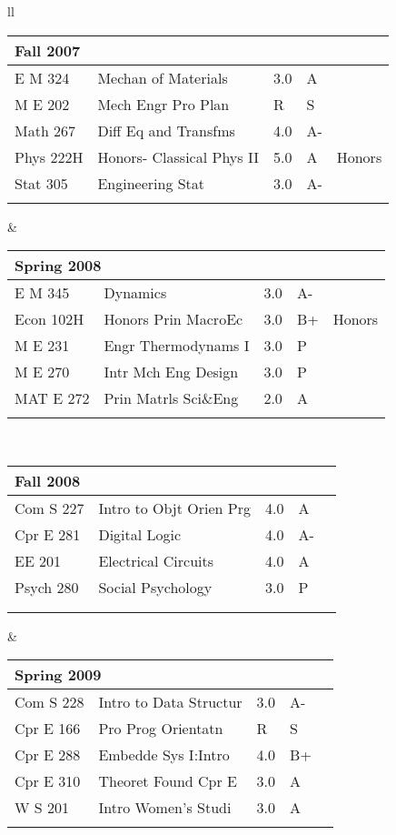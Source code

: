 \documentclass[oneside]{article}
\newcommand{\semtable}[1]{
  \begin{tabular}{p{1.5cm} p{3.5cm} p{.3cm} p{.3cm} p{0.75cm}}
    \multicolumn{5}{l}{#1}\\
    \hline
}
\newcommand{\semtableend}{
  \\
  \end{tabular}
}
\begin{document}
{\begin{tabular}{ll}
    \semtable{Fall 2007}
      E M 324 & Mechan of Materials & 3.0 & A &\\
      M E 202 & Mech Engr Pro Plan & R & S &\\
      Math 267 & Diff Eq and Transfms & 4.0 & A- &\\
      Phys 222H & Honors- Classical Phys II & 5.0 & A &Honors\\
      Stat 305 & Engineering Stat & 3.0 & A- & \\
    \semtableend
    &
    \semtable{Spring 2008}
      E M  345 & Dynamics & 3.0 & A- &\\
      Econ 102H & Honors Prin MacroEc & 3.0 & B+ &Honors\\
      M E 231 & Engr Thermodynams I & 3.0 & P&\\
      M E 270 & Intr Mch Eng Design & 3.0 & P&\\
      MAT E 272 & Prin Matrls Sci\&Eng & 2.0 & A&\\
    \semtableend
    \\
  
    \semtable{Fall 2008}
      Com S 227 & Intro to Objt Orien Prg & 4.0 & A &\\
      Cpr E 281 & Digital Logic & 4.0 & A- &\\
      EE 201 & Electrical Circuits & 4.0 & A &\\
      Psych 280 & Social Psychology & 3.0 & P &\\
      \\
    \semtableend
    &
    \semtable{Spring 2009}
      Com S 228 & Intro to Data Structur & 3.0 & A- &\\
      Cpr E 166 & Pro Prog Orientatn & R & S &\\
      Cpr E 288 & Embedde Sys I:Intro & 4.0 & B+ &\\
      Cpr E 310 & Theoret Found Cpr E & 3.0 & A &\\
      W S 201 & Intro Women's Studi & 3.0 & A &\\
    \semtableend
    \\
    

\end{tabular}}
\end{document}

